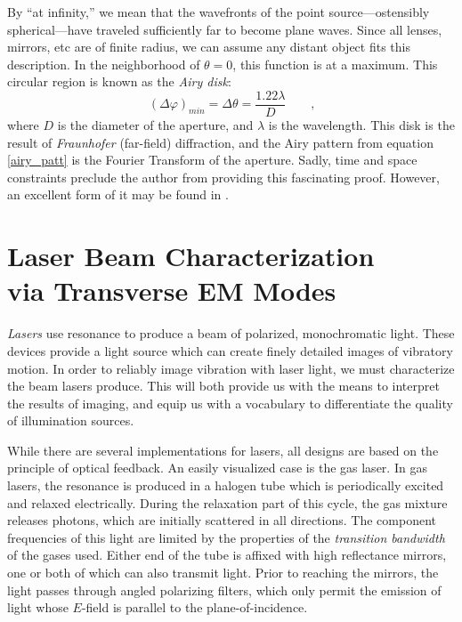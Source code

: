 \documentclass[a4paper,10pt]{report}
\numberwithin{equation}{section}
\begin{document}
By ``at infinity,'' we mean that the wavefronts of the point source---ostensibly spherical---have traveled sufficiently far to become plane waves. Since all lenses, mirrors, etc are of finite radius, we can assume any distant object fits this description. In the neighborhood of $\theta = 0$, this function is at a maximum. This circular region is known as the \emph{Airy disk}: \cite[p.~445]{Hecht1987} 
\begin{equation}
(\Delta \varphi)_{min} = \Delta \theta = \frac{1.22 \lambda}{D} \qquad \text{,}
\end{equation}
where $D$ is the diameter of the aperture, and $\lambda$ is the wavelength. This disk is the result of \emph{Fraunhofer} (far-field) diffraction, and the Airy pattern from equation \eqref{airy_patt} is the Fourier Transform of the aperture. \cite[p.~496]{Hecht1987} Sadly, time and space constraints preclude the author from providing this fascinating proof. However, an excellent form of it may be found in \cite[p.~104]{Goodman2005}. 
\section{Laser Beam Characterization\\ via Transverse EM Modes}\label{sec:lasers}
\emph{Lasers} use resonance to produce a beam of polarized, monochromatic light. These devices provide a light source which can create finely detailed images of vibratory motion. In order to reliably image vibration with laser light, we must characterize the beam lasers produce. This will both provide us with the means to interpret the results of imaging, and equip us with a vocabulary to differentiate the quality of illumination sources. 

While there are several implementations for lasers, all designs are based on the principle of optical feedback. An easily visualized case is the gas laser. In gas lasers, the resonance is produced in a halogen tube which is periodically excited and relaxed electrically. During the relaxation part of this cycle, the gas mixture releases photons, which are initially scattered in all directions. The component frequencies of this light are limited by the properties of the \emph{transition bandwidth} of the gases used. Either end of the tube is affixed with high reflectance mirrors, one or both of which can also transmit light. Prior to reaching the mirrors, the light passes through angled polarizing filters, which only permit the emission of light whose $E$-field is parallel to the plane-of-incidence. \cite[p.564]{Hecht1987}
\end{document}
